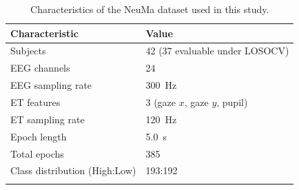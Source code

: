 \begin{table}[t]
  \caption{Characteristics of the NeuMa dataset used in this study.}
  \label{tab:dataset}
  \centering
  \begin{tabular}{@{}ll@{}}
    \toprule
    Characteristic & Value \\
    \midrule
    Subjects & 42 (37 evaluable under LOSOCV) \\
    EEG channels & 24 \\
    EEG sampling rate & 300~Hz \\
    ET features & 3 (gaze $x$, gaze $y$, pupil) \\
    ET sampling rate & 120~Hz \\
    Epoch length & 5.0~s \\
    Total epochs & 385 \\
    Class distribution (High:Low) & 193:192 \\
    \botrule
  \end{tabular}
\end{table}
